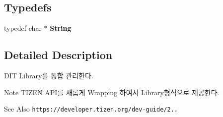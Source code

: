 \subsection*{Typedefs}
\begin{DoxyCompactItemize}
\item 
typedef char $\ast$ {\bfseries String}\label{dit_8h_a2efe6d463d80744789f228f5dc4baa39}

\end{DoxyCompactItemize}


\subsection{Detailed Description}
D\-I\-T Library를 통합 관리한다. \begin{DoxyNote}{Note}
T\-I\-Z\-E\-N A\-P\-I를 새롭게 Wrapping 하여서 Library형식으로 제공한다. 
\end{DoxyNote}
\begin{DoxySeeAlso}{See Also}
{\tt https\-://developer.\-tizen.\-org/dev-\/guide/2..} 
\end{DoxySeeAlso}
